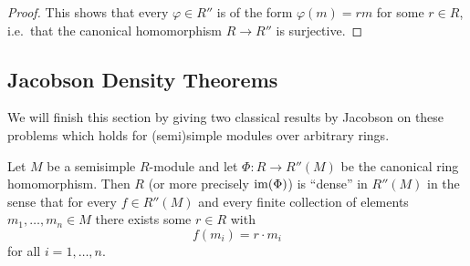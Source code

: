 \begin{proof}
  This shows that every $\varphi \in R''$ is of the form $\varphi(m) = rm$ for some $r \in R$, i.e.\ that the canonical homomorphism $R \to R''$ is surjective.
\end{proof}







\subsection{Jacobson Density Theorems}
\label{subsection: Jacobson Density Theorems}


\begin{fluff}
  We will finish this section by giving two classical results by Jacobson on these problems which holds for (semi)simple modules over arbitrary rings.
\end{fluff}


\begin{theorem}
  \label{theorem: first jacobson density theorem}
  Let $M$ be a semisimple $R$-module and let $\Phi \colon R \to R''(M)$ be the canonical ring homomorphism.
  Then $R$ (or more precisely $\operatorname{im}(\Phi)$) is \enquote{dense} in $R''(M)$ in the sense that for every $f \in R''(M)$ and every finite collection of elements $m_1, \dotsc, m_n \in M$ there exists some $r \in R$ with
  \[
      f(m_i)
    = r \cdot m_i
  \]
  for all $i = 1, \dotsc, n$.
\end{theorem}


